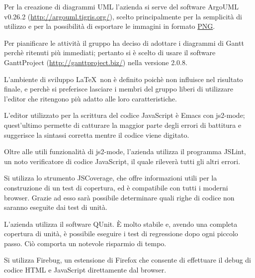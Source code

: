 Per la creazione di diagrammi UML l'azienda si serve del software ArgoUML v0.26.2 (\href{http://argouml.tigris.org/}{http://argouml.tigris.org/}), scelto principalmente per la semplicit\`a di utilizzo e per la possibilit\`a di esportare le immagini in formato \underline{PNG}.
 
Per pianificare le attivit\`a il gruppo ha deciso di adottare i diagrammi di Gantt perch\`e ritenuti pi\`u immediati; pertanto si \`e scelto di usare il software GanttProject (\href{http://ganttproject.biz/}{http://ganttproject.biz/}) nella versione 2.0.8.
 
L'ambiente di sviluppo \LaTeX \ non \`e definito poich\`e non influisce nel risultato finale, e perch\`e si preferisce lasciare i membri del gruppo liberi di utilizzare l'editor che ritengono pi\`u adatto alle loro caratteristiche.
 
L'editor utilizzato per la scrittura del codice JavaScript \`e Emacs con js2-mode; quest'ultimo permette di catturare la maggior parte degli errori di battitura e suggerisce la sintassi corretta mentre il codice viene digitato. 
 
Oltre alle utili funzionalit\`a di js2-mode, l'azienda utilizza il programma JSLint, un noto verificatore di codice JavaScript, il quale rilever\`a tutti gli altri errori.

Si utilizza lo strumento JSCoverage, che offre informazioni utili per la construzione di un test di copertura, ed \`e compatibile con tutti i moderni browser. Grazie ad esso sar\`a possibile determinare quali righe di codice non saranno eseguite dai test di unit\`a.

L'azienda utilizza il software QUnit. \`E molto stabile e, avendo una completa copertura di unit\`a,  \`e possibile eseguire i test di regressione dopo ogni piccolo passo. Ci\`o comporta un notevole risparmio di tempo.

Si utilizza Firebug, un estensione di Firefox che consente di effettuare il debug di codice HTML e JavaScript direttamente dal browser.

